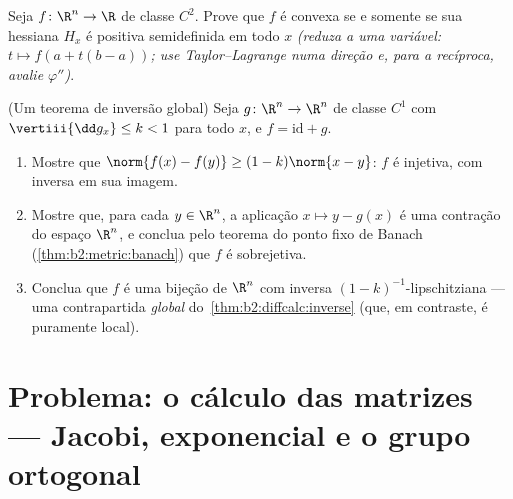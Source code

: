 \begin{exercise}[$\star\star$]\label{exo:b2:diffcalc:11}
Seja $f \colon \R^n \to \R$ de classe $C^2$. Prove que $f$ é convexa se
e somente se sua hessiana $H_x$ é positiva semidefinida em todo
$x$ \emph{(reduza a uma variável: $t \mapsto f(a + t(b-a))$;
use Taylor--Lagrange numa direção e, para a recíproca,
avalie $\varphi''$)}.
\end{exercise}

\begin{exercise}[$\star\star\star$]\label{exo:b2:diffcalc:12}
(Um teorema de inversão global) Seja $g \colon \R^n \to \R^n$ de classe $C^1$
com $\vertiii{\dd g_x} \leq k < 1$ para todo $x$, e $f =
\mathrm{id} + g$.
\begin{enumerate}
  \item Mostre que $\norm{f(x) - f(y)} \geq (1 - k)\norm{x - y}$: $f$
        é injetiva, com inversa  em sua imagem.
  \item Mostre que, para cada $y \in \R^n$, a aplicação $x \mapsto y -
        g(x)$ é uma contração do espaço  $\R^n$,
        e conclua pelo teorema do ponto fixo de Banach
        (\cref{thm:b2:metric:banach}) que $f$ é sobrejetiva.
  \item Conclua que $f$ é uma bijeção de $\R^n$ com
        inversa $(1-k)^{-1}$-lipschitziana --- uma contrapartida
        \emph{global} do~\cref{thm:b2:diffcalc:inverse} (que,
        em contraste, é puramente local).
\end{enumerate}
\end{exercise}

\section{Problema: o cálculo das matrizes --- Jacobi,
exponencial e o grupo ortogonal}


